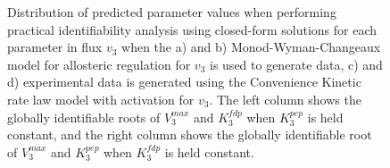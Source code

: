 \documentclass[10pt]{article}
\begin{document}
\begin{figure}[!tbhp]
	\caption{Distribution of predicted parameter values when performing practical identifiability analysis using closed-form solutions for each parameter in flux $v_3$ when the a) and b) Monod-Wyman-Changeaux model for allosteric regulation for $v_3$ is used to generate data, c) and d) experimental data is generated using the Convenience Kinetic rate law model with activation for $v_3$. The left column shows the globally identifiable roots of $V_3^{max}$ and $K_3^{fdp}$ when $K_3^{pep}$ is held constant, and the right column shows the globally identifiable root of $V_3^{max}$ and $K_3^{pep}$ when $K_3^{fdp}$ is held constant.}\label{fig:parameter_value_v3_var}
\end{figure}	

\end{document}
